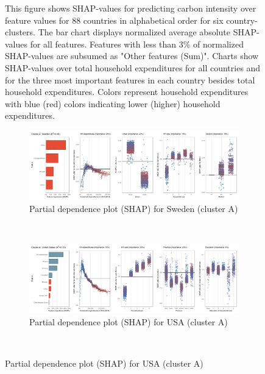 \begin{figure}[ht!]
    \begin{subcaption2}
     This figure shows SHAP-values for predicting carbon intensity over feature values for 88 countries in alphabetical order for six country-clusters. The bar chart displays normalized average absolute SHAP-values for all features. Features with less than 3\% of normalized SHAP-values are subsumed as "Other features (Sum)". Charts show SHAP-values over total household expenditures for all countries and for the three most important features in each country besides total household expenditures. Colors represent household expenditures with blue (red) colors indicating lower (higher) household expenditures.
     \end{subcaption2}
\end{figure}

\begin{figure}[ht!]\ContinuedFloat
    \centering
   \begin{subfigure}[b]{\textwidth}
    \centering
         \caption{Partial dependence plot (SHAP) for Sweden (cluster A)}
         \label{fig:5b_SWE}
         \includegraphics[width=\textwidth]{Figure 5b/Figure_5b_SWE}
         \end{subfigure}
    \\
    \vspace{0.5cm}
    \begin{subfigure}[b]{\textwidth}
   \centering
         \caption{Partial dependence plot (SHAP) for USA (cluster A)}
         \label{fig:5b_USA}
         \includegraphics[width=\textwidth]{Figure 5b/Figure_5b_USA}   
         \end{subfigure}
    \\

\end{figure}
